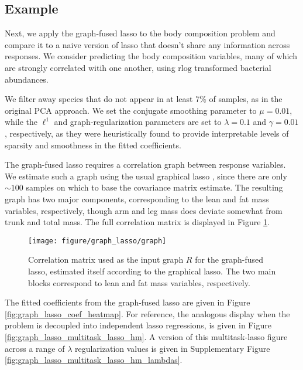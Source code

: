 \documentclass{article}
\begin{document}
\subsection{Example}
\label{subsec:graph_fused_example}

Next, we apply the graph-fused lasso to the body composition problem and compare
it to a naive version of lasso that doesn't share any information across
responses. We consider predicting the body composition variables, many of which
are strongly correlated witih one another, using $\text{rlog}$ transformed
bacterial abundances.

We filter away species that do not appear in at least 7\% of samples,
as in the original PCA approach. We set the conjugate smoothing parameter to
$\mu = 0.01$, while the $\ell^{1}$ and graph-regularization parameters are set
to $\lambda = 0.1$ and $\gamma = 0.01$, respectively, as they were heuristically
found to provide interpretable levels of sparsity and smoothness in the fitted
coefficients.

The graph-fused lasso requires a correlation graph between response variables.
We estimate such a graph using the usual graphical lasso
\citep{friedman2008sparse}, since there are only $\sim 100$ samples on which to
base the covariance matrix estimate. The resulting graph has two major
components, corresponding to the lean and fat mass variables, respectively,
though arm and leg mass does deviate somewhat from trunk and total mass. The
full correlation matrix is displayed in Figure \ref{fig:graph_lasso_graph}.

\begin{figure}[ht]
  \centering
  \texttt{[image: figure/graph\_lasso/graph]}
  \caption{Correlation matrix used as the input graph $R$ for the graph-fused
    lasso, estimated itself according to the graphical
    lasso. The two main blocks correspond to lean and fat mass variables,
    respectively. \label{fig:graph_lasso_graph} }
\end{figure}

The fitted coefficients from the graph-fused lasso are given in Figure
\ref{fig:graph_lasso_coef_heatmap}. For reference, the analogous display when
the problem is decoupled into independent lasso regressions, is given in Figure
\ref{fig:graph_lasso_multitask_lasso_hm}. A version of this multitask-lasso
figure across a range of $\lambda$ regularization values is given in
Supplementary Figure \ref{fig:graph_lasso_multitask_lasso_hm_lambdas}.
\end{document}
